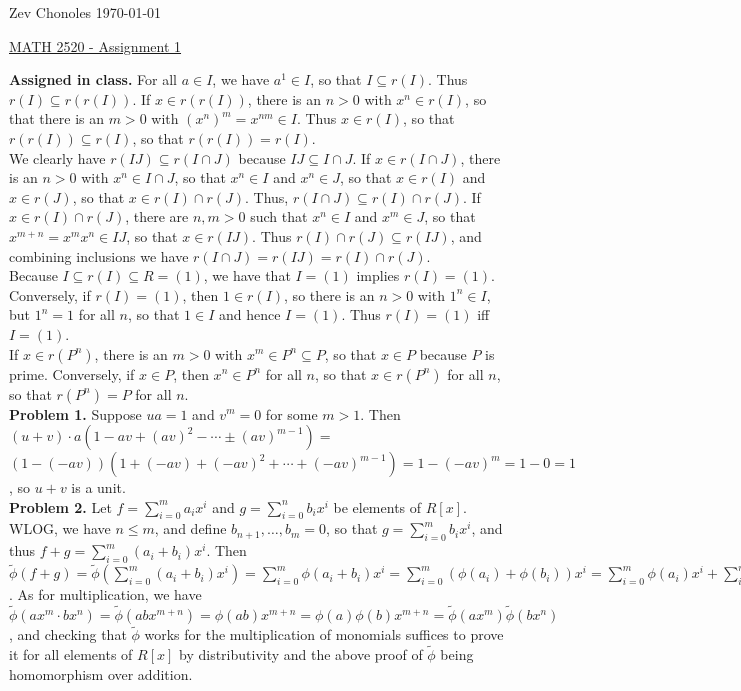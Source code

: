 \documentclass[11pt]{article}
\newcommand{\num}[1]{\noindent \textbf{#1}}
\theoremstyle{definition}
\begin{document}
\noindent Zev Chonoles \hfill \today\\[-0.4in]
\begin{center}
\noindent \underline{MATH 2520 - Assignment 1}
\end{center}

\num{Assigned in class.} For all $a\in I$, we have $a^1\in I$, so that
$ I\subseteq r(I)$. Thus $r(I)\subseteq r(r(I))$. If $x\in r(r(I))$,
there is an $n>0$ with $x^n\in r(I)$, so that there is an $m>0$ with
$(x^n)^m=x^{nm}\in I$. Thus $x\in r(I)$, so that $r(r(I))\subseteq r(I)$,
so that $r(r(I))=r(I)$.\\

We clearly have $r(IJ)\subseteq r(I\cap J)$ because $IJ\subseteq I\cap
J$. If $x\in r(I\cap J)$, there is an $n>0$ with $x^n\in I\cap J$, so that
$x^n\in I$ and $x^n\in J$, so that $x\in r(I)$ and $x\in r(J)$, so that
$x\in r(I)\cap r(J)$. Thus, $r(I\cap J)\subseteq r(I)\cap r(J)$. If $x\in
r(I)\cap r(J)$, there are $n,m>0$ such that $x^n\in I$ and $x^m\in J$, so that
$x^{m+n}=x^mx^n\in IJ$, so that $x\in r(IJ)$. Thus $r(I)\cap r(J)\subseteq
r(IJ)$, and combining inclusions we have $r(I\cap J)=r(IJ)=r(I)\cap r(J)$.\\

Because $I\subseteq r(I)\subseteq R = (1)$, we have that $I=(1)$ implies
$r(I)=(1)$. Conversely, if $r(I)=(1)$, then $1\in r(I)$, so there is an
$n>0$ with $1^n\in I$, but $1^n=1$ for all $n$, so that $1\in I$ and hence
$I=(1)$. Thus $r(I)=(1)$ iff $I=(1)$.\\

If $x\in r(P^n)$, there is an $m>0$ with $x^m\in P^n\subseteq P$, so that
$x\in P$ because $P$ is prime. Conversely, if $x\in P$, then $x^n\in P^n$ for
all $n$, so that $x\in r(P^n)$ for all $n$, so that $r(P^n)=P$ for all $n$.\\

\num{Problem 1.} Suppose $ua=1$ and $v^m=0$ for some
$m>1$. Then  $(u+v)\cdot a(1-av+(av)^2-\cdots\pm(av)^{m-1})=$
$(1-(-av))(1+(-av)+(-av)^2+\cdots+(-av)^{m-1})=1-(-av)^m=1-0=1$, so $u+v$
is a unit. \\

\num{Problem 2.} Let $f=\sum_{i=0}^m a_ix^i$ and $g=\sum_{i=0}^n b_ix^i$ be
elements of $R[x]$. WLOG, we have $n\leq m$, and define $b_{n+1},\ldots,b_m=0$,
so that $g=\sum_{i=0}^m b_ix^i$, and thus $f+g=\sum_{i=0}^m
(a_i+b_i)x^i$. Then $\tilde{\phi}(f+g)=\tilde{\phi}(\sum_{i=0}^m
(a_i+b_i)x^i)=\sum_{i=0}^m\phi(a_i+b_i)x^i=\sum_{i=0}^m(\phi(a_i)+\phi(b_i))x^i=\sum_{i=0}^m\phi(a_i)x^i+\sum_{i=0}^m\phi(b_i)x^i=\tilde{\phi}(f)+\tilde{\phi}(g)$.
As for multiplication, we have $\tilde{\phi}(ax^m\cdot
bx^n)=\tilde{\phi}(abx^{m+n})=\phi(ab)x^{m+n}=\phi(a)\phi(b)x^{m+n}=\tilde{\phi}(ax^m)\tilde{\phi}(bx^n)$,
and checking that $\tilde{\phi}$ works for the multiplication of monomials
suffices to prove it for all elements of $R[x]$ by distributivity and the
above proof of $\tilde{\phi}$ being homomorphism over addition. \\
\end{document}
